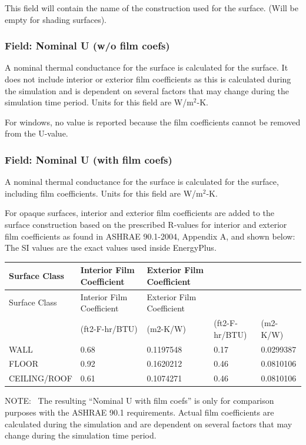 This field will contain the name of the construction used for the surface. (Will be empty for shading surfaces).

\subsubsection{Field: Nominal U (w/o film coefs)}\label{field-nominal-u-wo-film-coefs}

A nominal thermal conductance for the surface is calculated for the surface. It does not include interior or exterior film coefficients as this is calculated during the simulation and is dependent on several factors that may change during the simulation time period. Units for this field are W/m\(^{2}\)-K.

For windows, no value is reported because the film coefficients cannot be removed from the U-value.

\subsubsection{Field: Nominal U (with film coefs)}\label{field-nominal-u-with-film-coefs}

A nominal thermal conductance for the surface is calculated for the surface, including film coefficients. Units for this field are W/m\(^{2}\)-K.

For opaque surfaces, interior and exterior film coefficients are added to the surface construction based on the prescribed R-values for interior and exterior film coefficients as found in ASHRAE 90.1-2004, Appendix A, and shown below:~ The SI values are the exact values used inside EnergyPlus.

\begin{longtable}[c]{p{1.2in}p{1.2in}p{1.2in}p{1.2in}p{1.2in}}
\toprule
Surface Class & Interior Film Coefficient & Exterior Film Coefficient \tabularnewline
\midrule
\endfirsthead

\toprule
Surface Class & Interior Film Coefficient & Exterior Film Coefficient \tabularnewline
\midrule
\endhead

 & (ft2-F-hr/BTU) & (m2-K/W) & (ft2-F-hr/BTU) & (m2-K/W) \tabularnewline
WALL & 0.68 & 0.1197548 & 0.17 & 0.0299387 \tabularnewline
FLOOR & 0.92 & 0.1620212 & 0.46 & 0.0810106 \tabularnewline
CEILING/ROOF & 0.61 & 0.1074271 & 0.46 & 0.0810106 \tabularnewline
\bottomrule
\end{longtable}

NOTE:~ The resulting ``Nominal U with film coefs'' is only for comparison purposes with the ASHRAE 90.1 requirements. Actual film coefficients are calculated during the simulation and are dependent on several factors that may change during the simulation time period.

